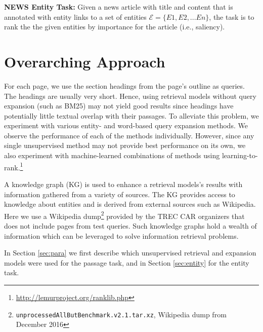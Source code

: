 \documentclass{article}
\begin{document}
\noindent \textbf{NEWS Entity Task:} Given a news article with title and content that is annotated with entity links to a set of entities  $\mathcal{E}=\{E1, E2, ... En\}$, the task is to rank the the given entities by importance for the article (i.e., saliency). 

\medskip 

\section{Overarching Approach}
\label{ref:overarching}
 For each page, we use the section headings from the page's outline as queries. The headings are usually very short. Hence, using retrieval models without query expansion (such as BM25) may not yield good results since headings have potentially little textual overlap with their passages. To alleviate this problem, we experiment with various entity- and word-based query expansion methods. We observe the performance of each of the methods individually. However, since any single unsupervised method may not provide best performance on its own, we also experiment with machine-learned combinations of methods using learning-to-rank.\footnote{\url{http://lemurproject.org/ranklib.php}} 

A knowledge graph (KG) is used to enhance a retrieval models's results with information gathered from a variety of sources. The KG provides access to knowledge about entities and is derived from external sources such as Wikipedia. Here we use a Wikipedia dump\footnote{\texttt{unprocessedAllButBenchmark.v2.1.tar.xz}, Wikipedia dump from December 2016} provided by the TREC CAR organizers that does not include pages from test queries. Such knowledge graphs hold a wealth of information which can be leveraged to solve information retrieval problems. 

In Section \ref{sec:para} we first describe which unsupervised retrieval and expansion models were used for the passage task, and in Section \ref{sec:entity} for the entity task.  

\end{document}
